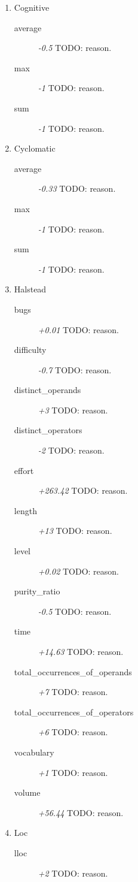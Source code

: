 \begin{enumerate}
  \item Cognitive
        \begin{description}
          \item [average] \textit{-0.5} TODO: reason.
          \item [max] \textit{-1} TODO: reason.
          \item [sum] \textit{-1} TODO: reason.
        \end{description}
  \item Cyclomatic
        \begin{description}
          \item [average] \textit{-0.33} TODO: reason.
          \item [max] \textit{-1} TODO: reason.
          \item [sum] \textit{-1} TODO: reason.
        \end{description}
  \item Halstead
        \begin{description}
          \item [bugs] \textit{+0.01} TODO: reason.
          \item [difficulty] \textit{-0.7} TODO: reason.
          \item [distinct\_operands] \textit{+3} TODO: reason.
          \item [distinct\_operators] \textit{-2} TODO: reason.
          \item [effort] \textit{+263.42} TODO: reason.
          \item [length] \textit{+13} TODO: reason.
          \item [level] \textit{+0.02} TODO: reason.
          \item [purity\_ratio] \textit{-0.5} TODO: reason.
          \item [time] \textit{+14.63} TODO: reason.
          \item [total\_occurrences\_of\_operands] \textit{+7} TODO: reason.
          \item [total\_occurrences\_of\_operators] \textit{+6} TODO: reason.
          \item [vocabulary] \textit{+1} TODO: reason.
          \item [volume] \textit{+56.44} TODO: reason.
        \end{description}
  \item Loc
        \begin{description}
          \item [lloc] \textit{+2} TODO: reason.

\end{description}
\end{enumerate}
